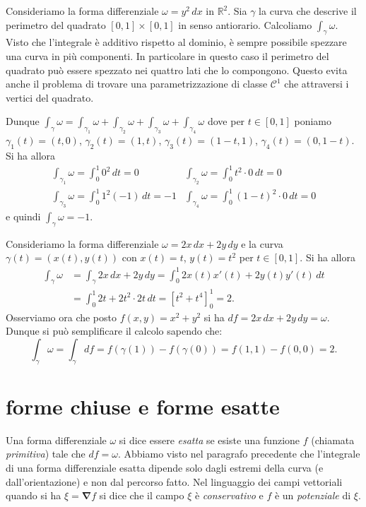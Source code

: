 \documentclass[italian,a4paper]{scrartcl}
\newcommand{\RR}{{\mathbb R}}
\newcommand{\C}{{\mathcal C}}
\newcommand{\vecnabla}{\mathbf{\nabla}}
\begin{document}
\begin{example}
Consideriamo la forma differenziale $\omega = y^2 \, dx$ in $\RR^2$. Sia $\gamma$
la curva che descrive il perimetro del quadrato $[0,1]\times[0,1]$ in
senso antiorario. Calcoliamo $\int_\gamma \omega$. Visto che
l'integrale è additivo rispetto al dominio, è sempre possibile
spezzare una curva in più componenti. In particolare in questo caso il
perimetro del quadrato può essere spezzato nei quattro lati che lo
compongono. Questo evita anche il problema di trovare una
parametrizzazione di classe $\C^1$ che attraversi i vertici del
quadrato.

Dunque $\int_\gamma \omega = \int_{\gamma_1} \omega + \int_{\gamma_2}
\omega + \int_{\gamma_3} \omega + \int_{\gamma_4} \omega$ dove per
$t\in [0,1]$ poniamo $\gamma_1(t)=(t,0)$, $\gamma_2(t)=(1,t)$,
$\gamma_3(t)=(1-t,1)$, $\gamma_4(t)=(0,1-t)$.
Si ha allora
\begin{align*}
\int_{\gamma_1} \omega = \int_0^1 0^2\, dt = 0 &
\int_{\gamma_2} \omega = \int_0^1 t^2 \cdot 0\, dt = 0 \\
\int_{\gamma_3} \omega = \int_0^1 1^2 (-1)\, dt = -1 &
\int_{\gamma_4} \omega = \int_0^1 (1-t)^2\cdot 0\, dt = 0
\end{align*}
e quindi $\int_\gamma \omega = -1$.
\end{example}

\begin{example}
Consideriamo la forma differenziale $\omega = 2x\, dx + 2y \,
dy$ e la curva $\gamma(t) =
(x(t),y(t))$ con $x(t) = t$, $y(t)=t^2$ per $t\in [0,1]$. Si ha allora
\begin{align*}
\int_\gamma \omega 
&= \int_\gamma 2x\, dx + 2y\, dy
= \int_0^1 2x(t) x'(t) + 2y(t) y'(t) \, dt\\
&= \int_0^1 2 t + 2 t^2\cdot 2t \, dt
= [ t^2 + t^4 ]_0^1 = 2. 
\end{align*}
Osserviamo ora che posto $f(x,y)=x^2+y^2$ si ha $df = 2x\, dx + 2y\, dy =
\omega$. Dunque si può semplificare il calcolo sapendo che:
\[
 \int_\gamma \omega = \int_\gamma df = f(\gamma(1)) - f(\gamma(0)) 
 = f(1,1) - f(0,0) = 2.
\]
\end{example}

\section{forme chiuse e forme esatte}
Una forma differenziale $\omega$ si dice essere \emph{esatta} se
esiste una funzione $f$ (chiamata \emph{primitiva}) tale che $df = \omega$. Abbiamo visto nel
paragrafo precedente che l'integrale di una forma differenziale esatta
dipende solo dagli estremi della curva (e dall'orientazione) e non dal
percorso fatto. Nel linguaggio dei campi vettoriali quando si ha $\xi =
\vecnabla f$ si dice che il campo $\xi$ è \emph{conservativo} e $f$
è un \emph{potenziale} di $\xi$.
\end{document}
